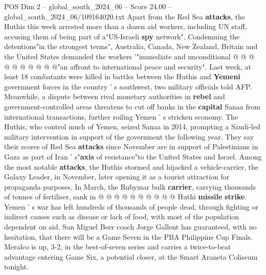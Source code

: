 \begin{textsample}{POS Dim 2 – global\_south\_2024\_06 – Score 24.00 – global\_south\_2024\_06/109164020.txt}
Apart from the Red Sea \textbf{attacks}, the Huthis this week arrested more than a dozen aid workers, including UN staff, accusing them of being part of a"US-Israeli \textbf{spy} network".
Condemning the detentions"in the strongest terms", Australia, Canada, New Zealand, Britain and the United States demanded the workers '"immediate and unconditional @ @ @ @ @ @ @ @ @ @"an affront to international peace and security".
Last week, at least 18 combatants were killed in battles between the Huthis and \textbf{Yemeni} government forces in the country ' s southwest, two military officials told AFP.
Meanwhile, a dispute between rival monetary authorities in \textbf{rebel} and government-controlled areas threatens to cut off banks in the \textbf{capital} Sanaa from international transactions, further roiling Yemen ' s stricken economy.
The Huthis, who control much of Yemen, seized Sanaa in 2014, prompting a Saudi-led military intervention in support of the government the following year.
They say their scores of Red Sea \textbf{attacks} since November are in support of Palestinians in Gaza as part of Iran ' s"\textbf{axis} of resistance"to the United States and Israel.
Among the most notable \textbf{attacks}, the Huthis stormed and hijacked a vehicle-carrier, the Galaxy Leader, in November, later opening it as a tourist attraction for propaganda purposes.
In March, the Rubymar bulk \textbf{carrier}, carrying thousands of tonnes of fertiliser, sank in @ @ @ @ @ @ @ @ @ @ Huthi \textbf{missile} \textbf{strike}.
Yemen ' s war has left hundreds of thousands of people dead, through fighting or indirect causes such as disease or lack of food, with most of the population dependent on aid.
San Miguel Beer coach Jorge Gallent has guaranteed, with no hesitation, that there will be a Game Seven in the PBA Philippine Cup Finals.
Meralco is up, 3-2, in the best-of-seven series and carries a twice-to-beat advantage entering Game Six, a potential closer, at the Smart Araneta Coliseum tonight.

\end{textsample}
